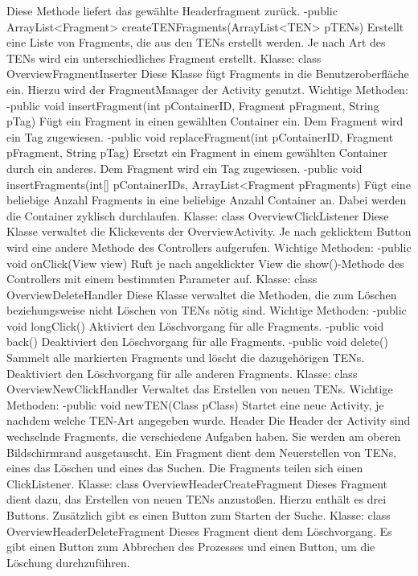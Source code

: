 Diese Methode liefert das gewählte Headerfragment zurück.
-public ArrayList<Fragment> createTENFragments(ArrayList<TEN> pTENs)
Erstellt eine Liste von Fragments, die aus den TENs erstellt werden. Je nach Art des TENs wird ein unterschiedliches Fragment erstellt.
Klasse: class OverviewFragmentInserter
Diese Klasse fügt Fragments in die Benutzeroberfläche ein. Hierzu wird der FragmentManager der Activity genutzt.
Wichtige Methoden:
-public void insertFragment(int pContainerID, Fragment pFragment, String pTag)
Fügt ein Fragment in einen gewählten Container ein. Dem Fragment wird ein Tag zugewiesen.
-public void replaceFragment(int pContainerID, Fragment pFragment, String pTag)
Ersetzt ein Fragment in einem gewählten Container durch ein anderes. Dem Fragment wird ein Tag zugewiesen.
-public void insertFragments(int[] pContainerIDs, ArrayList<Fragment pFragments)
Fügt eine beliebige Anzahl Fragments in eine beliebige Anzahl Container an. Dabei werden die Container zyklisch durchlaufen.
Klasse: class OverviewClickListener
Diese Klasse verwaltet die Klickevents der OverviewActivity. Je nach geklicktem Button wird eine andere Methode des Controllers aufgerufen.
Wichtige Methoden:
-public void onClick(View view)
Ruft je nach angeklickter View die show()-Methode des Controllers mit einem bestimmten Parameter auf.
Klasse: class OverviewDeleteHandler
Diese Klasse verwaltet die Methoden, die zum Löschen beziehungsweise nicht Löschen von TENs nötig sind.
Wichtige Methoden:
-public void longClick()
Aktiviert den Löschvorgang für alle Fragments.
-public void back()
Deaktiviert den Löschvorgang für alle Fragments.
-public void delete()
Sammelt alle markierten Fragments und löscht die dazugehörigen TENs. Deaktiviert den Löschvorgang für alle anderen Fragments.
Klasse: class OverviewNewClickHandler
Verwaltet das Erstellen von neuen TENs.
Wichtige Methoden:
-public void newTEN(Class pClass)
Startet eine neue Activity, je nachdem welche TEN-Art angegeben wurde.
Header
Die Header der Activity sind wechselnde Fragments, die verschiedene Aufgaben haben. Sie werden am oberen Bildschirmrand ausgetauscht. Ein Fragment dient dem Neuerstellen von TENs, eines das Löschen und eines das Suchen.
Die Fragments teilen sich einen ClickListener.
Klasse: class OverviewHeaderCreateFragment
Dieses Fragment dient dazu, das Erstellen von neuen TENs anzustoßen. Hierzu enthält es drei Buttons. Zusätzlich gibt es einen Button zum Starten der Suche.
Klasse: class OverviewHeaderDeleteFragment
Dieses Fragment dient dem Löschvorgang. Es gibt einen Button zum Abbrechen des Prozesses und einen Button, um die Löschung durchzuführen.
